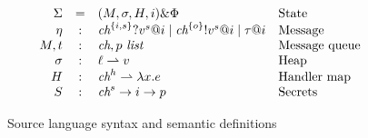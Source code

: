 \documentclass[conference]{IEEEtran}
\theoremstyle{definition}
\newcommand{\sch}{\textit{ch}}
\newcommand{\loc}{\ell}
\newcommand{\partialfun}{\rightharpoonup}
\newcommand{\evt}{\eta}
\newcommand{\with}{\&}
\begin{document}
\begin{figure}[t]
  \begin{displaymath}
    \begin{array}{rcll}
      \Sigma & = & (M, \sigma, H,i) \with \Phi & \hbox{State} \\
      \evt & : & \sch^{\{i,s\}} ? v^s @ i \mid \sch^{\{o\}} ! v^s @ i \mid \tau @ i & \hbox{Message} \\
      M, t & : & \sch , p ~ \textit{list} & \hbox{Message queue}\\
      \sigma & : & \loc \partialfun  v & \hbox{Heap} \\
      H & : & \sch^h \partialfun \lambda x.e & \hbox{Handler map} \\
      S & : & \sch^s \rightarrow i \rightarrow p & \hbox{Secrets}
    \end{array}
  \end{displaymath}
  \caption{Source language syntax and semantic definitions}
  \label{fig:symbolic-lang}
\end{figure}
\end{document}
